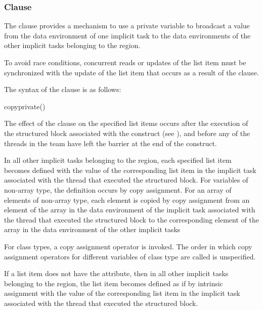 {{{{\subsubsection{ Clause}
\label{subsubsec:copyprivate clause}
\summary
The  clause provides a mechanism to use a private variable to broadcast 
a value from the data environment of one implicit task to the data environments of the 
other implicit tasks belonging to the  region.

To avoid race conditions, concurrent reads or updates of the list item must be 
synchronized with the update of the list item that occurs as a result of the 
 clause.

\syntax
The syntax of the  clause is as follows:

\begin{boxedcode}
copyprivate()
\end{boxedcode}

\descr
The effect of the  clause on the specified list items occurs after the 
execution of the structured block associated with the  construct (see 
), 
and before any of the threads in the team have left the barrier 
at the end of the construct.

\ccppspecificstart
In all other implicit tasks belonging to the  region, each specified list item 
becomes defined with the value of the corresponding list item in the implicit task associated with the 
thread that executed the structured block. For variables of non-array type, the definition 
occurs by copy assignment. For an array of elements of non-array type, each element is
copied by copy assignment from an element of the array in the data environment of the 
implicit task associated with the thread that executed the structured block to the 
corresponding element of the array in the data environment of the other implicit tasks
\ccppspecificend

\cppspecificstart
For class types, a copy assignment operator is invoked. The order in which copy 
assignment operators for different variables of class type are called is unspecified. 
\cppspecificend

\fortranspecificstart
If a list item does not have the  attribute, then in all other implicit tasks 
belonging to the  region, the list item becomes defined as if by intrinsic 
assignment with the value of the corresponding list item in the implicit task associated 
with the thread that executed the structured block. 

}}}}
